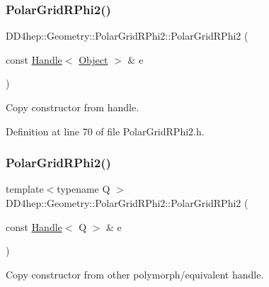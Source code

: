 \subsubsection{\texorpdfstring{Polar\+Grid\+R\+Phi2()}{PolarGridRPhi2()}\hspace{0.1cm}{\footnotesize\ttfamily [4/5]}}
{\footnotesize\ttfamily D\+D4hep\+::\+Geometry\+::\+Polar\+Grid\+R\+Phi2\+::\+Polar\+Grid\+R\+Phi2 (\begin{DoxyParamCaption}\item[{const \hyperlink{class_d_d4hep_1_1_handle}{Handle}$<$ \hyperlink{class_d_d4hep_1_1_geometry_1_1_polar_grid_r_phi2_a1067131b00d726a9739132de2eea6d86}{Object} $>$ \&}]{e }\end{DoxyParamCaption})\hspace{0.3cm}{\ttfamily [inline]}}



Copy constructor from handle. 



Definition at line 70 of file Polar\+Grid\+R\+Phi2.\+h.

\hypertarget{class_d_d4hep_1_1_geometry_1_1_polar_grid_r_phi2_ac15f62dee34a5d103ad5a765dfe5d5ce}{}\label{class_d_d4hep_1_1_geometry_1_1_polar_grid_r_phi2_ac15f62dee34a5d103ad5a765dfe5d5ce} 
\subsubsection{\texorpdfstring{Polar\+Grid\+R\+Phi2()}{PolarGridRPhi2()}\hspace{0.1cm}{\footnotesize\ttfamily [5/5]}}
{\footnotesize\ttfamily template$<$typename Q $>$ \\
D\+D4hep\+::\+Geometry\+::\+Polar\+Grid\+R\+Phi2\+::\+Polar\+Grid\+R\+Phi2 (\begin{DoxyParamCaption}\item[{const \hyperlink{class_d_d4hep_1_1_handle}{Handle}$<$ Q $>$ \&}]{e }\end{DoxyParamCaption})\hspace{0.3cm}{\ttfamily [inline]}}



Copy constructor from other polymorph/equivalent handle. 




